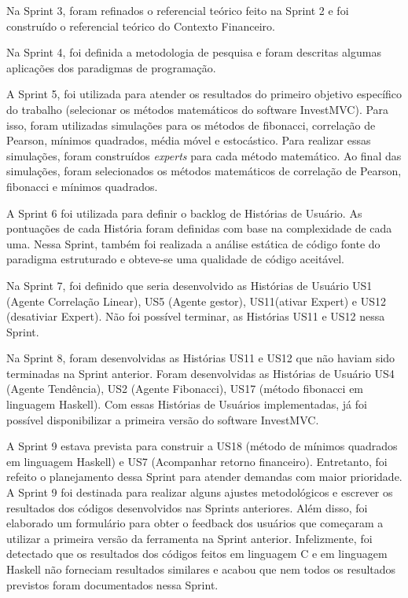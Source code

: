 Na Sprint 3, foram refinados o referencial teórico feito na Sprint 2 e foi construído o referencial teórico do Contexto Financeiro.

Na Sprint 4, foi definida a metodologia de pesquisa e foram descritas algumas aplicações dos paradigmas de programação.

A Sprint 5, foi utilizada para atender os resultados do primeiro objetivo específico do trabalho (selecionar os métodos matemáticos do software InvestMVC). Para isso, foram utilizadas simulações para os métodos de fibonacci, correlação de Pearson, mínimos quadrados, média móvel e estocástico. Para realizar essas simulações, foram construídos \textit{experts} para cada método matemático. Ao final das simulações, foram selecionados os métodos matemáticos de correlação de Pearson, fibonacci e mínimos quadrados.

A Sprint 6 foi utilizada para definir o backlog de Histórias de Usuário. As pontuações de cada História foram definidas com base na complexidade de cada uma. Nessa Sprint, também foi realizada a análise estática de código fonte do paradigma estruturado e obteve-se uma qualidade de código aceitável.

Na Sprint 7, foi definido que seria desenvolvido as Histórias de Usuário US1 (Agente Correlação Linear), US5 (Agente gestor), US11(ativar Expert) e US12 (desativiar Expert). Não foi possível terminar, as Histórias US11 e US12 nessa Sprint.

Na Sprint 8, foram desenvolvidas as Histórias US11 e US12 que não haviam sido terminadas na Sprint anterior. Foram desenvolvidas as Histórias de Usuário US4 (Agente Tendência), US2 (Agente Fibonacci), US17 (método fibonacci em linguagem Haskell). Com essas Histórias de Usuários implementadas, já foi possível disponibilizar a primeira versão do software InvestMVC.

A Sprint 9 estava prevista para construir a US18 (método de mínimos quadrados em linguagem Haskell) e US7 (Acompanhar retorno financeiro). Entretanto, foi refeito o planejamento dessa Sprint para atender demandas com maior prioridade. A Sprint 9 foi destinada para realizar alguns ajustes metodológicos e escrever os resultados dos códigos desenvolvidos nas Sprints anteriores. Além disso, foi elaborado um formulário para obter o feedback dos usuários que começaram a utilizar a primeira versão da ferramenta na Sprint anterior. Infelizmente, foi detectado que os resultados dos códigos feitos em linguagem C e em linguagem Haskell não forneciam resultados similares e acabou que nem todos os resultados previstos foram documentados nessa Sprint.

